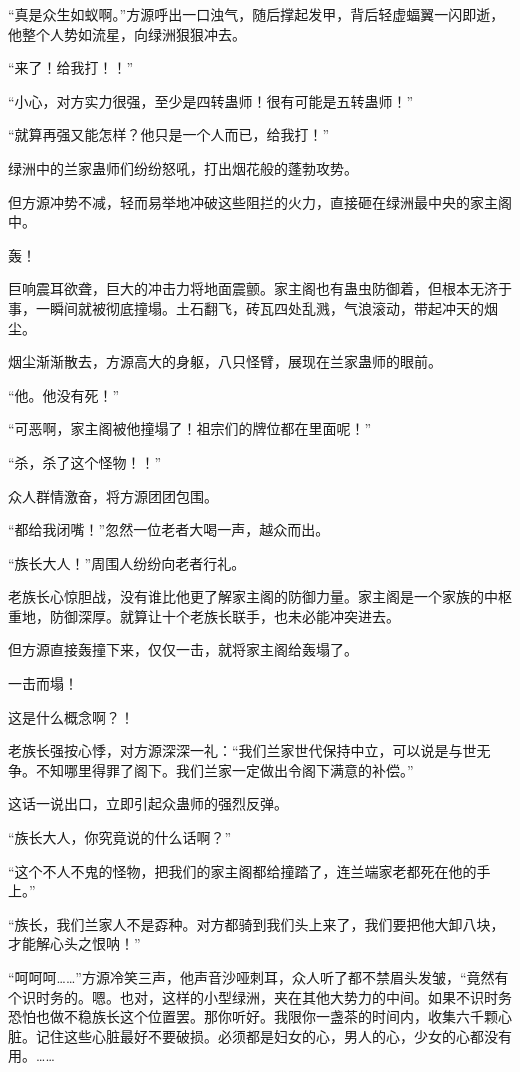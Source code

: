 \begin{this_body}
“真是众生如蚁啊。”方源呼出一口浊气，随后撑起发甲，背后轻虚蝠翼一闪即逝，他整个人势如流星，向绿洲狠狠冲去。

“来了！给我打！！”

“小心，对方实力很强，至少是四转蛊师！很有可能是五转蛊师！”

“就算再强又能怎样？他只是一个人而已，给我打！”

绿洲中的兰家蛊师们纷纷怒吼，打出烟花般的蓬勃攻势。

但方源冲势不减，轻而易举地冲破这些阻拦的火力，直接砸在绿洲最中央的家主阁中。

轰！

巨响震耳欲聋，巨大的冲击力将地面震颤。家主阁也有蛊虫防御着，但根本无济于事，一瞬间就被彻底撞塌。土石翻飞，砖瓦四处乱溅，气浪滚动，带起冲天的烟尘。

烟尘渐渐散去，方源高大的身躯，八只怪臂，展现在兰家蛊师的眼前。

“他。他没有死！”

“可恶啊，家主阁被他撞塌了！祖宗们的牌位都在里面呢！”

“杀，杀了这个怪物！！”

众人群情激奋，将方源团团包围。

“都给我闭嘴！”忽然一位老者大喝一声，越众而出。

“族长大人！”周围人纷纷向老者行礼。

老族长心惊胆战，没有谁比他更了解家主阁的防御力量。家主阁是一个家族的中枢重地，防御深厚。就算让十个老族长联手，也未必能冲突进去。

但方源直接轰撞下来，仅仅一击，就将家主阁给轰塌了。

一击而塌！

这是什么概念啊？！

老族长强按心悸，对方源深深一礼：“我们兰家世代保持中立，可以说是与世无争。不知哪里得罪了阁下。我们兰家一定做出令阁下满意的补偿。”

这话一说出口，立即引起众蛊师的强烈反弹。

“族长大人，你究竟说的什么话啊？”

“这个不人不鬼的怪物，把我们的家主阁都给撞踏了，连兰端家老都死在他的手上。”

“族长，我们兰家人不是孬种。对方都骑到我们头上来了，我们要把他大卸八块，才能解心头之恨呐！”

“呵呵呵……”方源冷笑三声，他声音沙哑刺耳，众人听了都不禁眉头发皱，“竟然有个识时务的。嗯。也对，这样的小型绿洲，夹在其他大势力的中间。如果不识时务恐怕也做不稳族长这个位置罢。那你听好。我限你一盏茶的时间内，收集六千颗心脏。记住这些心脏最好不要破损。必须都是妇女的心，男人的心，少女的心都没有用。……


\end{this_body}

